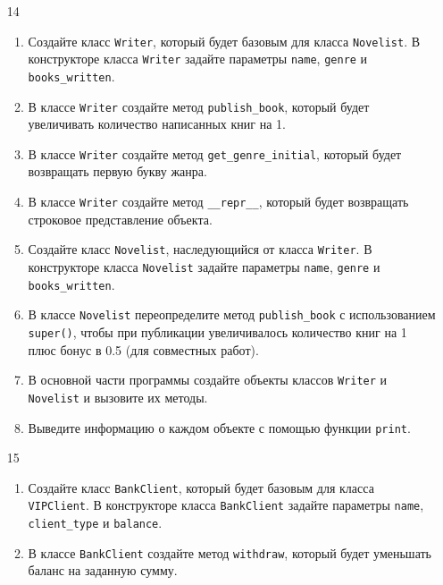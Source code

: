\begin{enumerate}
\item[14] 
\begin{enumerate}[leftmargin=*]
    \item Создайте класс \texttt{Writer}, который будет базовым для класса \texttt{Novelist}. В конструкторе класса \texttt{Writer} задайте параметры \texttt{name}, \texttt{genre} и \texttt{books\_written}.
    
    \item В классе \texttt{Writer} создайте метод \texttt{publish\_book}, который будет увеличивать количество написанных книг на 1.
    
    \item В классе \texttt{Writer} создайте метод \texttt{get\_genre\_initial}, который будет возвращать первую букву жанра.
    
    \item В классе \texttt{Writer} создайте метод \texttt{\_\_repr\_\_}, который будет возвращать строковое представление объекта.
    
    \item Создайте класс \texttt{Novelist}, наследующийся от класса \texttt{Writer}. В конструкторе класса \texttt{Novelist} задайте параметры \texttt{name}, \texttt{genre} и \texttt{books\_written}.
    
    \item В классе \texttt{Novelist} переопределите метод \texttt{publish\_book} с использованием \texttt{super()}, чтобы при публикации увеличивалось количество книг на 1 плюс бонус в 0.5 (для совместных работ).
    
    \item В основной части программы создайте объекты классов \texttt{Writer} и \texttt{Novelist} и вызовите их методы.
    
    \item Выведите информацию о каждом объекте с помощью функции \texttt{print}.
\end{enumerate}

\item[15] 
\begin{enumerate}[leftmargin=*]
    \item Создайте класс \texttt{BankClient}, который будет базовым для класса \texttt{VIPClient}. В конструкторе класса \texttt{BankClient} задайте параметры \texttt{name}, \texttt{client\_type} и \texttt{balance}.
    
    \item В классе \texttt{BankClient} создайте метод \texttt{withdraw}, который будет уменьшать баланс на заданную сумму.
    

\end{enumerate}
\end{enumerate}
